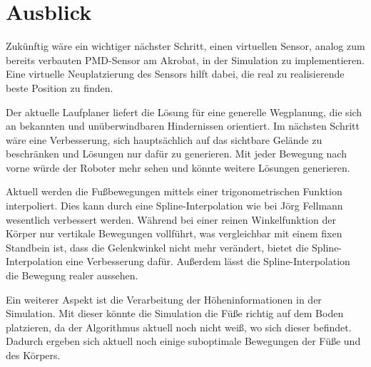 \chapter{Ausblick}
\label{kap8}

Zukünftig wäre ein wichtiger nächster Schritt, einen virtuellen Sensor, analog zum bereits verbauten PMD-Sensor am Akrobat, in der Simulation zu implementieren. Eine virtuelle Neuplatzierung des Sensors hilft dabei, die real zu realisierende beste Position zu finden. 

Der aktuelle Laufplaner liefert die Lösung für eine generelle Wegplanung, die sich an bekannten und unüberwindbaren Hindernissen orientiert. Im nächsten Schritt wäre eine Verbesserung, sich hauptsächlich auf das sichtbare Gelände zu beschränken und Lösungen nur dafür zu generieren. Mit jeder Bewegung nach vorne würde der Roboter mehr sehen und könnte weitere Lösungen generieren.

Aktuell werden die Fußbewegungen mittels einer trigonometrischen Funktion interpoliert. Dies kann durch eine Spline-Interpolation wie bei Jörg Fellmann \autocite{fellmann2007} wesentlich verbessert werden. Während bei einer reinen Winkelfunktion der Körper nur vertikale Bewegungen vollführt, was vergleichbar mit einem fixen Standbein ist, dass die Gelenkwinkel nicht mehr verändert, bietet die Spline-Interpolation eine Verbesserung dafür. Außerdem lässt die Spline-Interpolation die Bewegung realer aussehen.

Ein weiterer Aspekt ist die Verarbeitung der Höheninformationen in der Simulation. Mit dieser könnte die Simulation die Füße richtig auf dem Boden platzieren, da der Algorithmus aktuell noch nicht weiß, wo sich dieser befindet. Dadurch ergeben sich aktuell noch einige suboptimale Bewegungen der Füße und des Körpers.